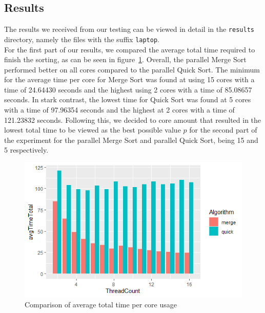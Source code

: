 \documentclass[twocolumn]{article}
\begin{document}
\subsection{Results}%
The results we received from our testing can be viewed in detail in the \texttt{results} directory, namely the files with the suffix \texttt{laptop}.\\
For the first part of our results, we compared the average total time required to finish the sorting, as can be seen in figure~\ref{fig:exp1_totalTime}. Overall, the parallel Merge Sort performed better on all cores compared to the parallel Quick Sort. The minimum for the average time per core for Merge Sort was found at using 15 cores with a time of 24.64430 seconds and the highest using 2 cores with a time of 85.08657 seconds. In stark contrast, the lowest time for Quick Sort was found at 5 cores with a time of 97.96354 seconds and the highest at 2 cores with a time of 121.23832 seconds. Following this, we decided to core amount that resulted in the lowest total time to be viewed as the best possible value $p$ for the second part of the experiment for the parallel Merge Sort and parallel Quick Sort, being 15 and 5 respectively.

\begin{figure}[h]
	\includegraphics[scale=0.5]{./figures/exp1_comparison_totaltime.png}
	\centering
	\caption{Comparison of average total time per core usage}
	\label{fig:exp1_totalTime}
\end{figure}
\end{document}
